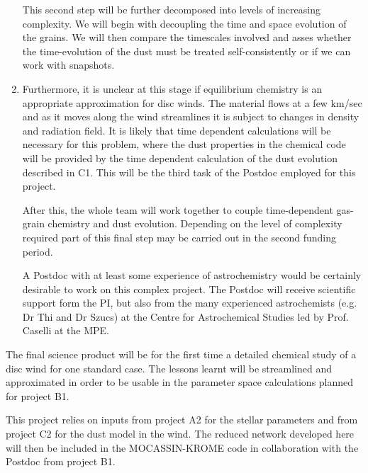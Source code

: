 \begin{enumerate}
This second step will be further decomposed into levels of increasing complexity. We will begin with decoupling the time and space evolution of the grains. We will then compare the timescales involved and asses whether the time-evolution of the dust must be treated self-consistently or if we can work with snapshots. 


\item Furthermore, it is unclear at this stage if equilibrium chemistry is
an appropriate approximation for disc winds. The material flows at a
few km/sec and as it moves along the wind streamlines it is subject to
changes in density and radiation field. It is likely that time
dependent calculations will be necessary for this problem, where the
dust properties in the chemical code will be provided by the time
dependent calculation of the dust evolution described in C1. This will
be the third task of the Postdoc employed for this project.

After
this, the whole team will work together to couple time-dependent
gas-grain chemistry and dust evolution.  Depending
on the level of complexity required part of this final step may be
carried out in the second funding period.

 A Postdoc with at least some experience of astrochemistry would be certainly desirable  to work on this complex  project. The Postdoc will receive scientific support form the PI, but also from the many experienced astrochemists (e.g. Dr Thi and Dr Szucs) at the Centre for Astrochemical Studies led by Prof. Caselli at the MPE. 

\end{enumerate}

The final science product will be for the first time a detailed
chemical study of a disc wind for one standard case. The lessons
learnt will be streamlined and approximated in order to be usable in
the parameter space calculations planned for project B1.  

\vspace{0.5em}
This project relies on inputs from project A2 for the stellar
parameters and from project C2 for the dust model in the wind. The
reduced network developed here will then be included in the
MOCASSIN-KROME code in collaboration with the Postdoc from project
B1.


\def\remove#1{}



